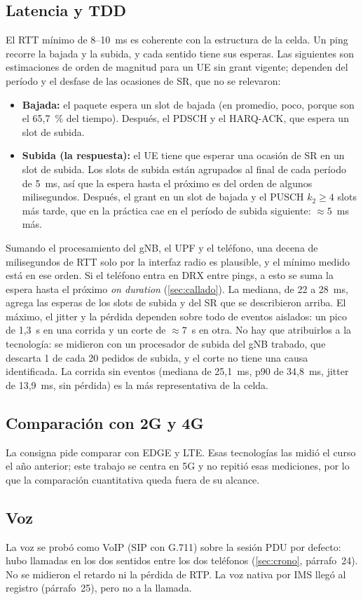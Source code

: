 \subsection{Latencia y TDD}\label{sec:latencia}
El RTT mínimo de 8--10~ms es coherente con la estructura de la celda. Un ping recorre la bajada y la subida, y cada sentido tiene sus esperas. Las siguientes son estimaciones de orden de magnitud para un UE sin grant vigente; dependen del período y el desfase de las ocasiones de SR, que no se relevaron:
\begin{itemize}
  \item \textbf{Bajada:} el paquete espera un slot de bajada (en promedio, poco, porque son el 65,7~\% del tiempo). Después, el PDSCH y el HARQ-ACK, que espera un slot de subida.
  \item \textbf{Subida (la respuesta):} el UE tiene que esperar una ocasión de SR en un slot de subida. Los slots de subida están agrupados al final de cada período de 5~ms, así que la espera hasta el próximo es del orden de algunos milisegundos. Después, el grant en un slot de bajada y el PUSCH $k_2\ge 4$ slots más tarde, que en la práctica cae en el período de subida siguiente: $\approx 5$~ms más.
\end{itemize}
Sumando el procesamiento del gNB, el UPF y el teléfono, una decena de milisegundos de RTT solo por la interfaz radio es plausible, y el mínimo medido está en ese orden. Si el teléfono entra en DRX entre pings, a esto se suma la espera hasta el próximo \emph{on duration} (\cref{sec:callado}). La mediana, de 22 a 28~ms, agrega las esperas de los slots de subida y del SR que se describieron arriba. El máximo, el jitter y la pérdida dependen sobre todo de eventos aislados: un pico de 1,3~s en una corrida y un corte de $\approx 7$~s en otra. No hay que atribuirlos a la tecnología: se midieron con un procesador de subida del gNB trabado, que descarta 1 de cada 20 pedidos de subida, y el corte no tiene una causa identificada. La corrida sin eventos (mediana de 25,1~ms, p90 de 34,8~ms, jitter de 13,9~ms, sin pérdida) es la más representativa de la celda.

\subsection{Comparación con 2G y 4G}
La consigna pide comparar con EDGE y LTE. Esas tecnologías las midió el curso el año anterior; este trabajo se centra en 5G y no repitió esas mediciones, por lo que la comparación cuantitativa queda fuera de su alcance.

\subsection{Voz}
La voz se probó como VoIP (SIP con G.711) sobre la sesión PDU por defecto: hubo llamadas en los dos sentidos entre los dos teléfonos (\cref{sec:crono}, párrafo~24). No se midieron el retardo ni la pérdida de RTP. La voz nativa por IMS llegó al registro (párrafo~25), pero no a la llamada.
